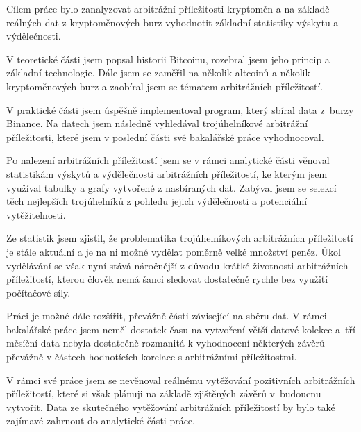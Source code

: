 \documentclass[thesis=B,czech]{FITthesis}[2019/03/21]
\begin{document}
\begin{conclusion}
Cílem práce bylo zanalyzovat arbitrážní příležitosti kryptoměn a na základě reálných dat z kryptoměnových burz vyhodnotit základní statistiky výskytu a výdělečnosti.

V teoretické části jsem popsal historii Bitcoinu, rozebral jsem jeho princip a základní technologie. Dále jsem se zaměřil na několik altcoinů a několik kryptoměnových burz a zaobíral jsem se tématem arbitrážních příležitostí. 

V praktické části jsem úspěšně implementoval program, který sbíral data z~burzy Binance. Na datech jsem následně vyhledával trojúhelníkové arbitrážní příležitosti, které jsem v poslední části své bakalářské práce vyhodnocoval. 

Po nalezení arbitrážních příležitostí jsem se v rámci analytické části věnoval statistikám výskytů a výdělečnosti arbitrážních příležitostí, ke kterým jsem využíval tabulky a grafy vytvořené z nasbíraných dat. Zabýval jsem se selekcí těch nejlepších trojúhelníků z pohledu jejich výdělečnosti a potenciální vytěžitelnosti.

Ze statistik jsem zjistil, že problematika trojúhelníkových arbitrážních příležitostí je stále aktuální a je na ni možné vydělat poměrně velké množství peněz. Úkol vydělávání se však nyní stává náročnější z důvodu krátké životnosti arbitrážních příležitostí, kterou člověk nemá šanci sledovat dostatečně rychle bez využití počítačové síly.

Práci je možné dále rozšířit, převážně části závisející na sběru dat. V rámci bakalářské práce jsem neměl dostatek času na vytvoření větší datové kolekce a~tří měsíční data nebyla dostatečně rozmanitá k vyhodnocení některých závěrů převážně v částech hodnotících korelace s arbitrážními příležitostmi.

V rámci své práce jsem se nevěnoval reálnému vytěžování pozitivních arbitrážních příležitostí, které si však plánuji na základě zjištěných závěrů v~budoucnu vytvořit. Data ze skutečného vytěžování arbitrážních příležitostí by bylo také zajímavé zahrnout do analytické části práce.

\end{conclusion}

% 
% 

\printbibliography

\appendix
\end{document}
